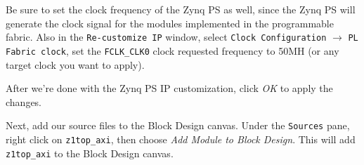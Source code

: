 \documentclass[11pt]{article}
\begin{document}
\begin{appendices}
\begin{center}
\end{center}

Be sure to set the clock frequency of the Zynq PS as well, since the Zynq PS will generate the clock signal for the modules implemented in the programmable fabric. Also in the \texttt{Re-customize IP} window, select \texttt{Clock Configuration} $\rightarrow$ \texttt{PL Fabric clock}, set the \verb|FCLK_CLK0| clock requested frequency to 50MH (or any target clock you want to apply).

\begin{center}
\end{center}

After we're done with the Zynq PS IP customization, click \emph{OK} to apply the changes.

Next, add our source files to the Block Design canvas. Under the \texttt{Sources} pane, right click on \texttt{z1top\_axi}, then choose \emph{Add Module to Block Design}. This will add \verb|z1top_axi| to the Block Design canvas.


\end{appendices}
\end{document}
